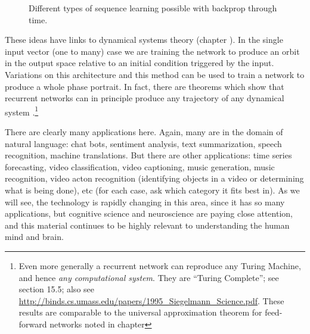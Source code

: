 \begin{figure}[h]
\centering
{}
\caption[Adapted from Karpathy, 2015 \cite{karpathy2015unreasonable}.]{Different types of sequence learning possible with backprop through time.}
\label{rnn_schema}
\end{figure}

These ideas have links to dynamical systems theory (chapter ). In the single input vector (one to many) case we are training the network to produce an orbit in the output space relative to an initial condition triggered by the input. Variations on this architecture and this method can be used to train a network to produce a whole phase portrait. In fact, there are theorems which show that recurrent networks can in principle produce any trajectory of any dynamical system \cite{funahashi1993approximation}.\footnote{Even more generally a recurrent network can reproduce any Turing Machine, and hence \emph{any computational system}. They are ``Turing Complete''; see \cite{haykin1998neural} section 15.5; also see \url{http://binds.cs.umass.edu/papers/1995_Siegelmann_Science.pdf}. These results are comparable to the universal approximation theorem for feed-forward networks noted in chapter } 

There are clearly many applications here. Again, many are in the domain of natural language: chat bots, sentiment analysis, text summarization, speech recognition, machine translations. But there are other applications: time series forecasting, video classification, video captioning, music generation, music recognition,  video acton recognition (identifying objects in a video or determining what is being done), etc (for each case, ask which category it fits best in).  As we will see, the technology is rapidly changing in this area, since it has so many applications, but cognitive science and neuroscience are paying close attention, and this material continues to be highly relevant to understanding the human mind and brain.

